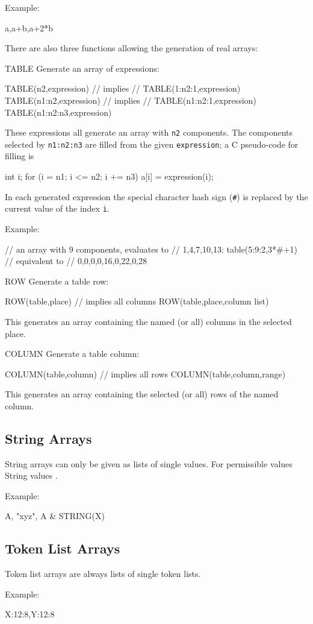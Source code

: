 \noindent Example:
\begin{example}
{a,a+b,a+2*b}
\end{example}
There are also three functions allowing the generation of real arrays:
\begin{kdescription}
\item[TABLE]
  Generate an array of expressions:
\begin{example}
TABLE(n2,expression)    // implies
                        // TABLE(1:n2:1,expression)
TABLE(n1:n2,expression) // implies
                        // TABLE(n1:n2:1,expression)
TABLE(n1:n2:n3,expression)
\end{example}
  These expressions all generate an array with \texttt{n2} components.
  The components selected by \texttt{n1:n2:n3} are filled from the given
  \texttt{expression};
  a C pseudo-code for filling is
\begin{example}
int i;
for (i = n1; i <= n2; i += n3) a[i] = expression(i);
\end{example}
  In each generated expression the special character hash sign (\texttt{\#})
  is replaced by the current value of the index \texttt{i}.
  \par
  \noindent Example:
\begin{example}
// an array with 9 components, evaluates to
// {1,4,7,10,13}:
table(5:9:2,3*#+1) // equivalent to
                   // {0,0,0,0,16,0,22,0,28}
\end{example}
\item[ROW]
  Generate a table row:
\begin{example}
ROW(table,place)             // implies all columns
ROW(table,place,column list)
\end{example}
  This generates an array containing the named (or all) columns in the
  selected place.
\item[COLUMN]
  Generate a table column:
\begin{example}
COLUMN(table,column)         // implies all rows
COLUMN(table,column,range)
\end{example}
  This generates an array containing the selected (or all) rows of the
  named column.
\end{kdescription}

\subsection{String Arrays}
\label{sec:strarray}
String arrays can only be given as lists of single values.
For permissible values String values .
\par
\noindent Example:
\begin{example}
{A, "xyz", A & STRING(X)}
\end{example}

\subsection{Token List Arrays}
\label{sec:tokarray}
Token list arrays are always lists of single token lists.
\par
\noindent Example:
\begin{example}
{X:12:8,Y:12:8}
\end{example}


